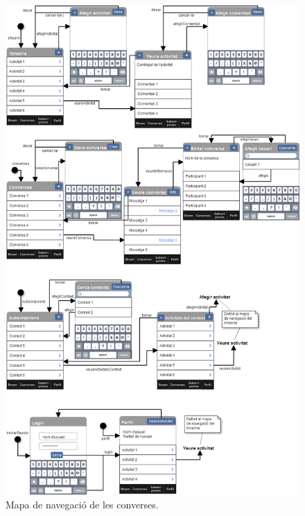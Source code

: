 \begin{figure}[ht]
    \centering
    \includegraphics*[scale=0.5,viewport=0 760 980 1200]{Memoria/Arquitectura/Projecte/Presentacio/mapa_de_navegacio.png}
    \caption{Mapa de navegació de les converses.}
    \label{fig:mapa_nav_converses}
\end{figure}
\FloatBarrier

